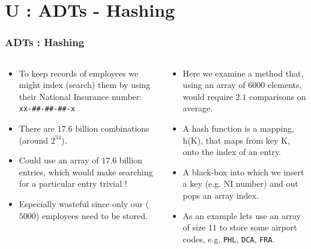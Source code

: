 \section{U : ADTs - Hashing}
\label{chap:adts_hashing}


\begin{frame}[fragile]
\frametitle{ADTs : Hashing}
\begin{columns}[T]

\begin{column}{0.45\textwidth}
\begin{itemize}[<+->]
\item To keep records of employees we might index (search) them by using
their National Insurance number: \verb^xx-##-##-##-x^
\item There are $17.6$ billion combinations (around $2^{34}$).
\item Could use an array of $17.6$ billion entries, which would make searching
for a particular entry trivial !
\item Especially wasteful since only our ($5000$) employees need to be
stored.
\end{itemize}
\end{column}

\pause
\begin{column}{0.45\textwidth}
\begin{itemize}[<+->]
\item Here we examine a method that, using an array of $6000$
elements, would require $2.1$ comparisons on average.
\item A hash function is a mapping, h(K), that maps from key K, onto the index of an entry.
\item A black-box into which we insert a key (e.g. NI number) and out pops an array index.
\item As an example lets use an array of size $11$ to store some airport codes, e.g.
\verb^PHL^, \verb^DCA^, \verb^FRA^.
\end{itemize}
\end{column}

\end{columns}
\end{frame}


